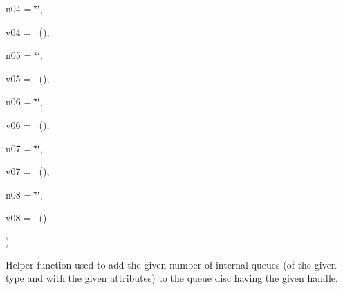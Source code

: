 {\begin{DoxyParamCaption}
\item[{std\+::string}]{n04 = {\ttfamily \char`\"{}\char`\"{}}, }
\item[{const {\bf Attribute\+Value} \&}]{v04 = {~()}, }
\item[{std\+::string}]{n05 = {\ttfamily \char`\"{}\char`\"{}}, }
\item[{const {\bf Attribute\+Value} \&}]{v05 = {~()}, }
\item[{std\+::string}]{n06 = {\ttfamily \char`\"{}\char`\"{}}, }
\item[{const {\bf Attribute\+Value} \&}]{v06 = {~()}, }
\item[{std\+::string}]{n07 = {\ttfamily \char`\"{}\char`\"{}}, }
\item[{const {\bf Attribute\+Value} \&}]{v07 = {~()}, }
\item[{std\+::string}]{n08 = {\ttfamily \char`\"{}\char`\"{}}, }
\item[{const {\bf Attribute\+Value} \&}]{v08 = {~()}}
\end{DoxyParamCaption}
)}\hypertarget{classns3_1_1TrafficControlHelper_aefc1be32222be2d9aa714367552c7179}{}\label{classns3_1_1TrafficControlHelper_aefc1be32222be2d9aa714367552c7179}
Helper function used to add the given number of internal queues (of the given type and with the given attributes) to the queue disc having the given handle.


